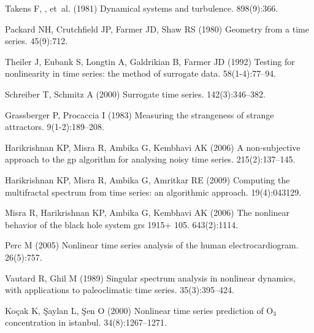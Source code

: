\documentclass[9pt,twocolumn,twoside]{pnas-new}
\begin{document}
\begin{thebibliography}{10}
Takens F, , et~al. (1981) Dynamical systems and turbulence.
 898(9):366.

Packard NH, Crutchfield JP, Farmer JD, Shaw RS (1980) Geometry from a time
  series.
 45(9):712.

Theiler J, Eubank S, Longtin A, Galdrikian B, Farmer JD (1992) Testing for
  nonlinearity in time series: the method of surrogate data.
 58(1-4):77--94.

Schreiber T, Schmitz A (2000) Surrogate time series.
 142(3):346--382.

Grassberger P, Procaccia I (1983) Measuring the strangeness of strange
  attractors.
 9(1-2):189--208.

Harikrishnan KP, Misra R, Ambika G, Kembhavi AK (2006) A non-subjective
  approach to the gp algorithm for analysing noisy time series.
 215(2):137--145.

Harikrishnan KP, Misra R, Ambika G, Amritkar RE (2009) Computing the
  multifractal spectrum from time series: an algorithmic approach.
  19(4):043129.

Misra R, Harikrishnan KP, Ambika G, Kembhavi AK (2006) The nonlinear behavior
  of the black hole system grs 1915+ 105.
 643(2):1114.

Perc M (2005) Nonlinear time series analysis of the human electrocardiogram.
 26(5):757.

Vautard R, Ghil M (1989) Singular spectrum analysis in nonlinear dynamics, with
  applications to paleoclimatic time series.
 35(3):395--424.

Ko{\c{c}}ak K, {\c{S}}aylan L, {\c{S}}en O (2000) Nonlinear time series
  prediction of $\text{O}_3$ concentration in istanbul.
 34(8):1267--1271.


\end{thebibliography}
\end{document}
